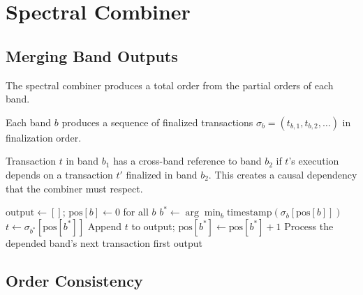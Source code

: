 \section{Spectral Combiner}

\label{sec:combiner}

\subsection{Merging Band Outputs}

The spectral combiner produces a total order from the partial orders of each band.

\begin{definition}
Each band $b$ produces a sequence of finalized transactions $\sigma_b = (t_{b,1}, t_{b,2}, \ldots)$
in finalization order.
\end{definition}

\begin{definition}
Transaction $t$ in band $b_1$ has a cross-band reference to band $b_2$ if $t$'s
execution depends on a transaction $t'$ finalized in band $b_2$. This creates a
causal dependency that the combiner must respect.
\end{definition}

\begin{algorithm}[H]
\caption{Spectral Combiner --- Deterministic Merge}
\label{alg:combiner}
\begin{algorithmic}[1]
    \State $\text{output} \gets []$; $\text{pos}[b] \gets 0$ for all $b$
        \State {}
        \State $b^* \gets \arg\min_b \text{timestamp}(\sigma_b[\text{pos}[b]])$
        \State $t \gets \sigma_{b^*}[\text{pos}[b^*]]$
        \State {}
            \State Append $t$ to output; $\text{pos}[b^*] \gets \text{pos}[b^*] + 1$
        \Else
            \State {}
            \State Process the depended band's next transaction first
        \EndIf
    \EndWhile
    \State \Return output
\EndFunction
\end{algorithmic}
\end{algorithm}

\subsection{Order Consistency}

